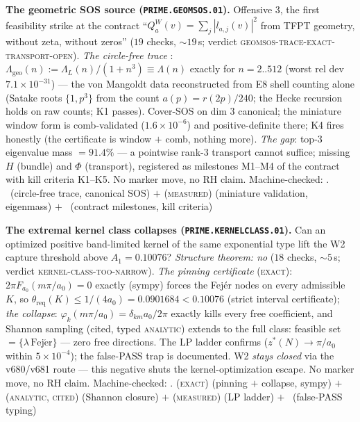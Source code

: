\par\smallskip\noindent\textbf{The geometric SOS source
(\texttt{PRIME.GEOMSOS.01}).}
Offensive 3, the first feasibility strike at the contract
``$Q^W_a(v)=\sum_j|l_{a,j}(v)|^2$ from TFPT geometry, without zeta,
without zeros'' ($19$ checks, ${\sim}19$\,s; verdict
\textsc{geomsos-trace-exact-transport-open}).  \emph{The circle-free
trace} \mE: $\Lambda_{\mathrm{geo}}(n):=\Lambda_L(n)/(1+n^3)\equiv
\Lambda(n)$ exactly for $n=2..512$ (worst rel dev
$7.1\times10^{-31}$) --- the von Mangoldt data reconstructed from E8
shell counting alone (Satake roots $\{1,p^3\}$ from the count
$a(p)=r(2p)/240$; the Hecke recursion holds on raw counts; K1
passes).  Cover-SOS on dim $3$ canonical; the miniature window form
is comb-validated ($1.6\times10^{-6}$) and positive-definite there;
K4 fires honestly (the certificate is window $+$ comb, nothing
more).  \emph{The gap}: top-3 eigenvalue mass $=91.4\%$ --- a
pointwise rank-3 transport cannot suffice; missing $H$ (bundle) and
$\Phi$ (transport), registered as milestones M1--M4 of the contract
with kill criteria K1--K5.  No marker move, no RH claim.
Machine-checked: .
\mE\ (circle-free trace, canonical SOS) $+$ (\textsc{measured})
(miniature validation, eigenmass) $+$ \mC\ (contract milestones,
kill criteria)
\par\smallskip


\par\smallskip\noindent\textbf{The extremal kernel class collapses
(\texttt{PRIME.KERNELCLASS.01}).}
Can an optimized positive band-limited kernel of the same exponential
type lift the W2 capture threshold above $A_1=0.10076$?
\emph{Structure theorem: no} ($18$ checks, ${\sim}5$\,s; verdict
\textsc{kernel-class-too-narrow}).  \emph{The pinning certificate}
(\textsc{exact}): $2\pi F_{a_0}(m\pi/a_0)=0$ exactly (sympy) forces
the Fej\'er nodes on every admissible $K$, so
$\theta_{\mathrm{req}}(K)\le1/(4a_0)=0.0901684<0.10076$ (strict
interval certificate); \emph{the collapse}:
$\varphi_k(m\pi/a_0)=\delta_{km}a_0/2\pi$ exactly kills every free
coefficient, and Shannon sampling (cited, typed \textsc{analytic})
extends to the full class: feasible set
$=\{\lambda\,\mathrm{Fej\acute er}\}$ --- zero free directions.  The
LP ladder confirms ($z^*(N)\to\pi/a_0$ within $5\times10^{-4}$); the
false-PASS trap is documented.  W2 \emph{stays closed} via the
v680/v681 route --- this negative shuts the kernel-optimization
escape.  No marker move, no RH claim.
Machine-checked: .
(\textsc{exact}) (pinning $+$ collapse, sympy) $+$
(\textsc{analytic, cited}) (Shannon closure) $+$
(\textsc{measured}) (LP ladder) $+$ \mC\ (false-PASS typing)
\par\smallskip


